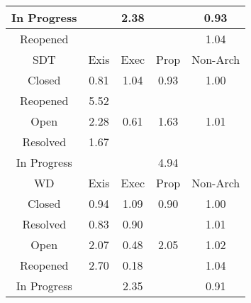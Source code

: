 \begin{tabular}{|c||c|c|c|c|}
\hline
In Progress &  & \cellcolor[rgb]{0.8423209068953688,0.8079414822135957,0.42000000000000004} 2.38 &  & \cellcolor[rgb]{0.8964649941148568,0.7759343054769883,0.40736732784053287} 0.93 \\ 
\hline
Reopened &  &  &  & \cellcolor[rgb]{0.908277680809074,0.8391841645937719,0.42} 1.04 \\ 
\hline
\hline
SDT & Exis & Exec & Prop & Non-Arch \\ 
\hline
Closed & \cellcolor[rgb]{0.8746877630806452,0.6728554119150544,0.3870419122086023} 0.81 & \cellcolor[rgb]{0.9081835100818474,0.8391395574071908,0.42} 1.04 & \cellcolor[rgb]{0.8969158320878978,0.7780682718827161,0.40778810994870457} 0.93 & \cellcolor[rgb]{0.9099020842616725,0.8395365321719163,0.4199086119775609} 1.00 \\ 
\hline
Reopened & \cellcolor[rgb]{0.6878935466650588,0.7347916799992384,0.42} 5.52 &  &  &  \\ 
\hline
Open & \cellcolor[rgb]{0.8473025974702775,0.8103012303806577,0.42} 2.28 & \cellcolor[rgb]{0.8376878445242393,0.49772246408139925,0.35250865488929} 0.61 & \cellcolor[rgb]{0.8790596519454086,0.8253440456583513,0.42} 1.63 & \cellcolor[rgb]{0.9096042449691818,0.8398125370906651,0.42} 1.01 \\ 
\hline
Resolved & \cellcolor[rgb]{0.8770706424075614,0.8244018832456869,0.42} 1.67 &  &  &  \\ 
\hline
In Progress &  &  & \cellcolor[rgb]{0.7162991688126694,0.7482469747007381,0.42} 4.94 &  \\ 
\hline
\hline
WD & Exis & Exec & Prop & Non-Arch \\ 
\hline
Closed & \cellcolor[rgb]{0.8985132529917549,0.7856293974943063,0.4092790361256379} 0.94 & \cellcolor[rgb]{0.9054437392722915,0.8378417712342433,0.42} 1.09 & \cellcolor[rgb]{0.8910686418806566,0.7503915715684413,0.40233073242194617} 0.90 & \cellcolor[rgb]{0.9091832333104343,0.8361339710027217,0.41923768442307185} 1.00 \\ 
\hline
Resolved & \cellcolor[rgb]{0.8786925226337919,0.6918112737999484,0.39077968779153915} 0.83 & \cellcolor[rgb]{0.892221186241648,0.7558469482104672,0.40340644049220475} 0.90 &  & \cellcolor[rgb]{0.9096914858023638,0.8398538616958565,0.42} 1.01 \\ 
\hline
Open & \cellcolor[rgb]{0.8576606656888822,0.8152076837473652,0.42} 2.07 & \cellcolor[rgb]{0.8149327440505235,0.3900149885058112,0.3312705611138219} 0.48 & \cellcolor[rgb]{0.8582081496155016,0.8154670182389218,0.42} 2.05 & \cellcolor[rgb]{0.9090211008020664,0.8395363109062418,0.42} 1.02 \\ 
\hline
Reopened & \cellcolor[rgb]{0.8263886437826522,0.800394620739151,0.42} 2.70 & \cellcolor[rgb]{0.76,0.13,0.28} 0.18 &  & \cellcolor[rgb]{0.9082010461266103,0.8391478639547101,0.42} 1.04 \\ 
\hline
In Progress &  & \cellcolor[rgb]{0.8435267000413003,0.8085126473879843,0.42000000000000004} 2.35 &  & \cellcolor[rgb]{0.8939889891382965,0.7642145485879366,0.40505638986241} 0.91 \\ 
\hline
\end{tabular}